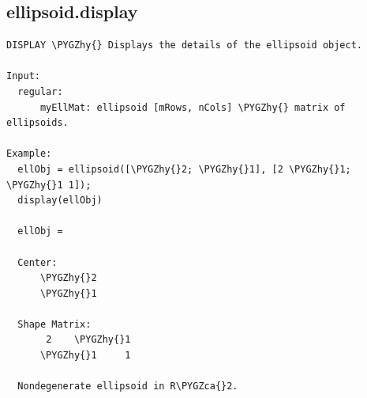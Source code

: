 \documentclass[letterpaper,10pt,english]{sphinxmanual}
\def\PYGZca{\char`\^}
\def\PYGZhy{\char`\-}
\begin{document}
\subsection{ellipsoid.display}
\label{chap_functions:ellipsoid-display}
\begin{Verbatim}[commandchars=\\\{\}]
DISPLAY \PYGZhy{} Displays the details of the ellipsoid object.

Input:
  regular:
      myEllMat: ellipsoid [mRows, nCols] \PYGZhy{} matrix of ellipsoids.

Example:
  ellObj = ellipsoid([\PYGZhy{}2; \PYGZhy{}1], [2 \PYGZhy{}1; \PYGZhy{}1 1]);
  display(ellObj)

  ellObj =

  Center:
      \PYGZhy{}2
      \PYGZhy{}1

  Shape Matrix:
       2    \PYGZhy{}1
      \PYGZhy{}1     1

  Nondegenerate ellipsoid in R\PYGZca{}2.
\end{Verbatim}
\end{document}
